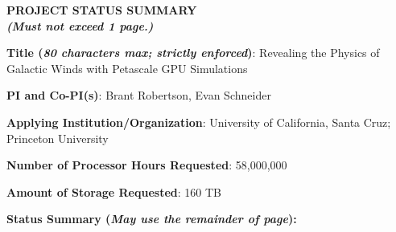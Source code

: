 \documentclass[11pt,letterpaper,english]{article}
\begin{document}
\setlength{\parindent}{0in} %

\pagestyle{fancy}   \renewcommand{%
\headrulewidth}{0.0pt}

\begin{center}
\bf \large {PROJECT STATUS SUMMARY} \\
{\bf \small {\em (Must not exceed 1 page.)}}
\end{center}



\textbf{Title (\emph{80 characters max; strictly enforced})}: Revealing the Physics of Galactic Winds with Petascale GPU Simulations \smallskip

\textbf{PI and Co-PI(s)}: Brant Robertson, Evan Schneider \smallskip

\textbf{Applying Institution/Organization}: University of California, Santa Cruz; Princeton University \smallskip

\textbf{Number of Processor Hours Requested}: 58,000,000 \smallskip

\textbf{Amount of Storage Requested}: 160 TB \smallskip

\textbf{Status Summary ({\emph{May use the remainder of page}}):} \\
\end{document}
